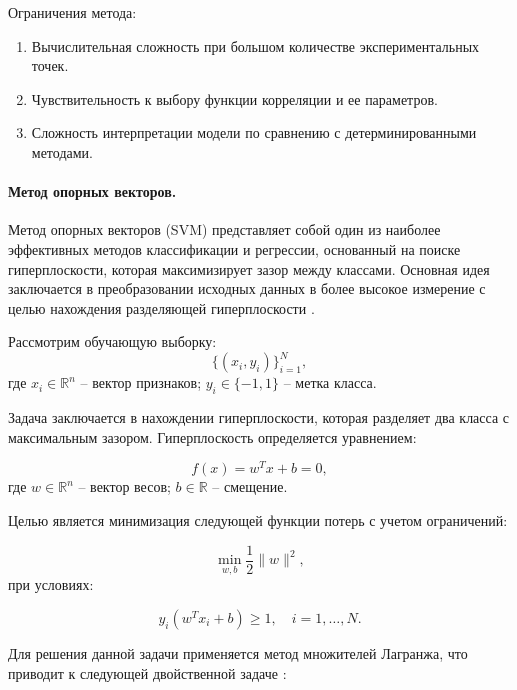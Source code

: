 Ограничения метода:

\begin{enumerate}
	\item Вычислительная сложность при большом количестве экспериментальных точек.
	\item Чувствительность к выбору функции корреляции и ее параметров.
	\item Сложность интерпретации модели по сравнению с детерминированными методами.
\end{enumerate}

\paragraph{Метод опорных векторов.}

Метод опорных векторов (SVM) представляет собой один из наиболее эффективных методов классификации и
регрессии, основанный на поиске гиперплоскости, которая максимизирует зазор между классами.
Основная идея заключается в преобразовании исходных данных в более
высокое измерение с целью нахождения разделяющей гиперплоскости \cite{Jakkula2006}.

Рассмотрим обучающую выборку:
\begin{equation}
	\{(x_i, y_i)\}_{i=1}^N,
\end{equation}
где $x_i \in \mathbb{R}^n$ -- вектор признаков;
$y_i \in \{-1, 1\}$ -- метка класса.

Задача заключается в нахождении гиперплоскости,
которая разделяет два класса с максимальным зазором. Гиперплоскость определяется уравнением:

\begin{equation}
	f(x) = w^T x + b = 0,
\end{equation}
где $w \in \mathbb{R}^n$ -- вектор весов;
$b \in \mathbb{R}$ -- смещение.

Целью является минимизация следующей функции потерь с учетом ограничений:

\begin{equation}
	\min_{w, b} \frac{1}{2} \|w\|^2,
\end{equation}
при условиях:

\begin{equation}
	y_i (w^T x_i + b) \geq 1, \quad i = 1, \ldots, N.
\end{equation}

Для решения данной задачи применяется метод множителей Лагранжа,
что приводит к следующей двойственной задаче \cite{Patle2013}:

